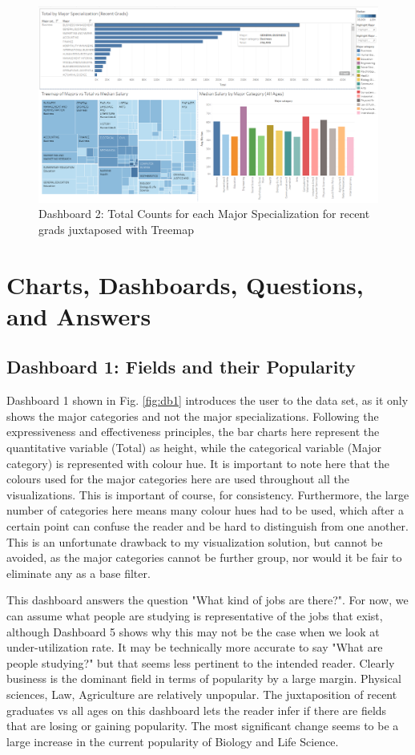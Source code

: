 \documentclass[sigchi]{acmart}
\begin{document}
  \begin{figure}[thpb]
  \includegraphics[width=1.0\textwidth]{DB2.png}
     \caption{Dashboard 2: Total Counts for each Major Specialization for recent grads juxtaposed with Treemap}
         \label{fig:db2}
  \end{figure}
  
\section{Charts, Dashboards, Questions, and Answers}
\subsection{Dashboard 1: Fields and their Popularity}
\label{sec:db1}

Dashboard 1 shown in Fig. \ref{fig:db1} introduces the user to the data set, as it only shows the major categories and not the major specializations. Following the expressiveness and effectiveness principles, the bar charts here represent the quantitative variable (Total) as height, while the categorical variable (Major category) is represented with colour hue. It is important to note here that the colours used for the major categories here are used throughout all the visualizations. This is important of course, for consistency. Furthermore, the large number of categories here means many colour hues had to be used, which after a certain point can confuse the reader and be hard to distinguish from one another. This is an unfortunate drawback to my visualization solution, but cannot be avoided, as the major categories cannot be further group, nor would it be fair to eliminate any as a base filter. 

This dashboard answers the question "What kind of jobs are there?". For now, we can assume what people are studying is representative of the jobs that exist, although Dashboard 5 shows why this may not be the case when we look at under-utilization rate. It may be technically more accurate to say "What are people studying?" but that seems less pertinent to the intended reader. Clearly business is the dominant field in terms of popularity by a large margin. Physical sciences, Law, Agriculture are relatively unpopular. The juxtaposition of recent graduates vs all ages on this dashboard lets the reader infer if there are fields that are losing or gaining popularity. The most significant change seems to be a large increase in the current popularity of Biology and Life Science.
\end{document}
